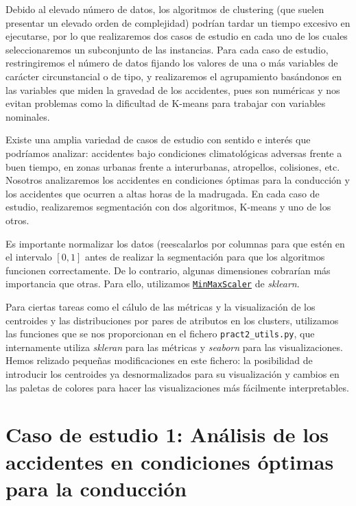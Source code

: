 \documentclass[oneside]{book}
\begin{document}
  Debido al elevado número de datos, los algoritmos de clustering (que
  suelen presentar un elevado orden de complejidad) podrían tardar un
  tiempo excesivo en ejecutarse, por lo que realizaremos dos casos de
  estudio en cada uno de los cuales seleccionaremos un subconjunto de
  las instancias. Para cada caso de estudio, restringiremos el número
  de datos fijando los valores de una o más variables de carácter
  circunstancial o de tipo, y realizaremos el agrupamiento basándonos
  en las variables que miden la gravedad de los accidentes, pues son
  numéricas y nos evitan problemas como la dificultad de K-means para
  trabajar con variables nominales.

  Existe una amplia variedad de casos de estudio con sentido e interés
  que podríamos analizar: accidentes bajo condiciones climatológicas
  adversas frente a buen tiempo, en zonas urbanas frente a
  interurbanas, atropellos, colisiones, etc. Nosotros analizaremos los
  accidentes en condiciones óptimas para la conducción y los
  accidentes que ocurren a altas horas de la madrugada. En cada caso
  de estudio, realizaremos segmentación con dos algoritmos, K-means y
  uno de los otros.

  Es importante normalizar los datos (reescalarlos por columnas para
  que estén en el intervalo $[0,1]$ antes de realizar la segmentación
  para que los algoritmos funcionen correctamente. De lo contrario,
  algunas dimensiones cobrarían más importancia que otras. Para ello,
  utilizamos
  \href{https://scikit-learn.org/stable/modules/generated/sklearn.preprocessing.MinMaxScaler.html}{\texttt{MinMaxScaler}}
  de \textit{sklearn}.

  Para ciertas tareas como el cálulo de las métricas y la
  visualización de los centroides y las distribuciones por pares de
  atributos en los clusters, utilizamos las funciones que se nos
  proporcionan en el fichero \texttt{pract2\_utils.py}, que
  internamente utiliza \textit{skleran} para las métricas y
  \textit{seaborn} para las visualizaciones. Hemos relizado pequeñas
  modificaciones en este fichero: la posibilidad de introducir los
  centroides ya desnormalizados para su visualización y cambios en las
  paletas de colores para hacer las visualizaciones más fácilmente
  interpretables.
  
  \section{Caso de estudio 1: Análisis de los accidentes en
    condiciones óptimas para la conducción}
\end{document}
